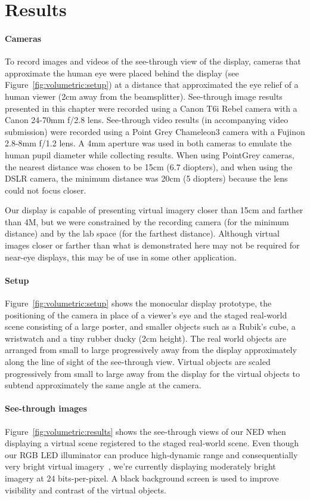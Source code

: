 \section{Results}
\label{sec:volumetric:results}
\paragraph{Cameras}
To record images and videos of the see-through view of the display, cameras that approximate the human eye were placed behind the display (see Figure~\ref{fig:volumetric:setup}) at a distance that approximated the eye relief of a human viewer (2cm away from the beamsplitter). See-through image results presented in this chapter were recorded using a Canon T6i Rebel camera with a Canon 24-70mm f/2.8 lens. See-through video results (in accompanying video submission) were recorded using a Point Grey Chameleon3 camera with a Fujinon 2.8-8mm f/1.2 lens. A 4mm aperture was used in both cameras to emulate the human pupil diameter while collecting results. When using PointGrey cameras, the nearest distance was chosen to be 15cm (6.7 diopters), and when using the DSLR camera, the minimum distance was 20cm (5 diopters) because the lens could not focus closer. 

Our display is capable of presenting virtual imagery closer than 15cm and farther than 4M, but we were constrained by the recording camera (for the minimum distance) and by the lab space (for the farthest distance). Although virtual images closer or farther than what is demonstrated here may not be required for near-eye displays, this may be of use in some other application.

\paragraph{Setup}
Figure~\ref{fig:volumetric:setup} shows the monocular display prototype, the positioning of the camera in place of a viewer's eye and the staged real-world scene consisting of a large poster, and smaller objects such as a Rubik's cube, a wristwatch and a tiny rubber ducky (2cm height). The real world objects are arranged from small to large progressively away from the display approximately along the line of sight of the see-through view. Virtual objects are scaled progressively from small to large away from the display for the virtual objects to subtend approximately the same angle at the camera. 

\paragraph{See-through images}
Figure~\ref{fig:volumetric:results} shows the see-through views of our NED when displaying a virtual scene registered to the staged real-world scene. Even though our RGB LED illuminator can produce high-dynamic range and consequentially very bright virtual imagery~\cite{Lincoln2017scene}, we're currently displaying moderately bright imagery at 24 bits-per-pixel. A black background screen is used to improve visibility and contrast of the virtual objects.

